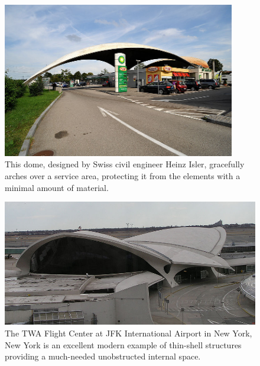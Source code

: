 \documentclass{thesis}
\begin{document}
\begin{figure}
\centering
\includegraphics[width=4in]{images/isler_dome_1.jpg}
\caption[A thin-shell dome over a service area in Switzerland]{This dome, designed by Swiss civil engineer Heinz Isler, gracefully arches over
a service area, protecting it from the elements with a minimal amount of material. \cite{img:isler_service}}
\label{fig:isler_service}
\end{figure}

\begin{figure}
\centering
\includegraphics[width=5in]{images/twa_flight_center.jpg}
\caption[The TWA Flight Center]{The TWA Flight Center at JFK International Airport in New York, New York is an excellent modern example of
thin-shell structures providing a much-needed unobstructed internal space. \cite{img:twa_jfk}}
\label{fig:twa_flight}
\end{figure}
\end{document}
